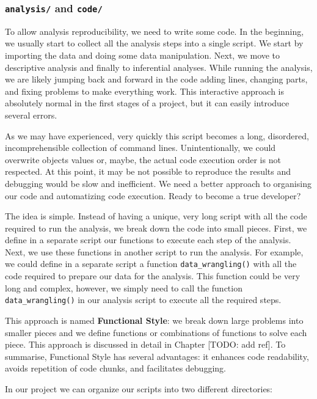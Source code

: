 \documentclass[
  11pt,
]{book}
\begin{document}
\hypertarget{analysis-code}{%
\subsubsection{\texorpdfstring{\texttt{analysis/} and \texttt{code/}}{analysis/ and code/}}\label{analysis-code}}

To allow analysis reproducibility, we need to write some code. In the beginning, we usually start to collect all the analysis steps into a single script. We start by importing the data and doing some data manipulation. Next, we move to descriptive analysis and finally to inferential analyses. While running the analysis, we are likely jumping back and forward in the code adding lines, changing parts, and fixing problems to make everything work. This interactive approach is absolutely normal in the first stages of a project, but it can easily introduce several errors.

As we may have experienced, very quickly this script becomes a long, disordered, incomprehensible collection of command lines. Unintentionally, we could overwrite objects values or, maybe, the actual code execution order is not respected. At this point, it may be not possible to reproduce the results and debugging would be slow and inefficient. We need a better approach to organising our code and automatizing code execution. Ready to become a true developer?

The idea is simple. Instead of having a unique, very long script with all the code required to run the analysis, we break down the code into small pieces. First, we define in a separate script our functions to execute each step of the analysis. Next, we use these functions in another script to run the analysis. For example, we could define in a separate script a function \texttt{data\_wrangling()} with all the code required to prepare our data for the analysis. This function could be very long and complex, however, we simply need to call the function \texttt{data\_wrangling()} in our analysis script to execute all the required steps.

This approach is named \textbf{Functional Style}: we break down large problems into smaller pieces and we define functions or combinations of functions to solve each piece. This approach is discussed in detail in Chapter {[}TODO: add ref{]}. To summarise, Functional Style has several advantages: it enhances code readability, avoids repetition of code chunks, and facilitates debugging.

In our project we can organize our scripts into two different directories:
\end{document}

